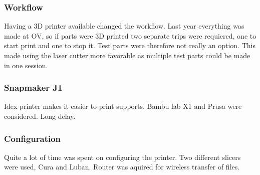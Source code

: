 \subsubsection{Workflow}
Having a 3D printer available changed the workflow.
Last year everything was made at OV, so if parts were 3D printed two separate trips were requiered, one to start print and one to stop it.
Test parts were therefore not really an option.
This made using the laser cutter more favorable as multiple test parts could be made in one session.

\subsubsection{Snapmaker J1}
Idex printer makes it easier to print supports.
Bambu lab X1 and Prusa were considered.
Long delay.

\subsubsection{Configuration}
Quite a lot of time was spent on configuring the printer.
Two different slicers were used, Cura and Luban.
Router was aquired for wireless transfer of files.
